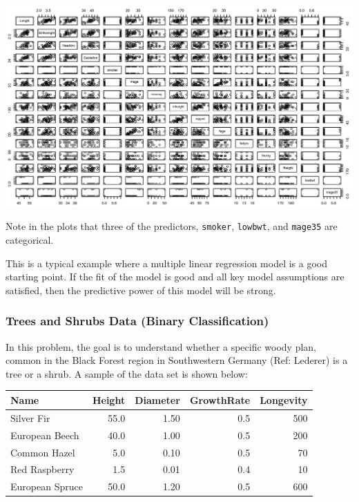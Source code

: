 \documentclass[
]{book}
\begin{document}
\begin{center}\includegraphics[width=1\linewidth]{images/week1/birthpairs} \end{center}

Note in the plots that three of the predictors, \texttt{smoker}, \texttt{lowbwt}, and \texttt{mage35} are categorical.

This is a typical example where a multiple linear regression model is a good starting point. If the fit of the model is good and all key model assumptions are satisfied, then the predictive power of this model will be strong.

\subsubsection*{\texorpdfstring{ Trees and Shrubs Data (Binary Classification) }{ Trees and Shrubs Data (Binary Classification) }}\label{trees-and-shrubs-data-binary-classification}

In this problem, the goal is to understand whether a specific woody plan, common in the Black Forest region in Southwestern Germany (Ref: Lederer) is a tree or a shrub. A sample of the data set is shown below:

\begin{tabular}{l|r|r|r|r}
\hline
Name & Height & Diameter & GrowthRate & Longevity\\
\hline
Silver Fir & 55.0 & 1.50 & 0.5 & 500\\
\hline
European Beech & 40.0 & 1.00 & 0.5 & 200\\
\hline
Common Hazel & 5.0 & 0.10 & 0.5 & 70\\
\hline
Red Raspberry & 1.5 & 0.01 & 0.4 & 10\\
\hline
European Spruce & 50.0 & 1.20 & 0.5 & 600\\
\hline
\end{tabular}
\end{document}
